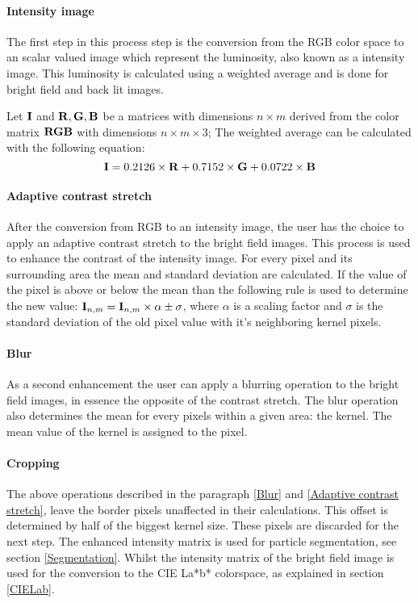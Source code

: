 \documentclass[11pt,fleqn,,a4paper,twoside,openright]{book}
\begin{document}
\paragraph{Intensity image}\label{IntensityImg} The first step in this process step is the conversion from the RGB color space to an scalar valued image which represent the luminosity, also known as a intensity image. This luminosity is calculated using a weighted average and is done for bright field and back lit images.
\begin{sBox}
	Let $\mat{I}$ and $\mat{R}, \mat{G}, \mat{B}$  be a matrices with dimensions $n \times m$ derived from the color matrix $\mat{RGB}$ with dimensions $n \times m \times 3$; The weighted average can be calculated with the following equation:
	\begin{equation}
	\mat{I} =0.2126\times \mat{R} + 0.7152\times \mat{G} + 0.0722\times \mat{B}
	\end{equation}
\end{sBox}

\paragraph{Adaptive contrast stretch}\label{Adaptive contrast stretch} After the conversion from RGB to an intensity image, the user has the choice to apply an adaptive contrast stretch to the bright field images. This process is used to enhance the contrast of the intensity image. For every pixel and its surrounding area the mean and standard deviation are calculated. If the value of the pixel is above or below the mean than the following rule is used to determine the new value: $\mat{I}_{n,m}=\mat{I}_{n,m} \times \alpha \pm \sigma$, where $\alpha$ is a scaling factor and $\sigma$ is the standard deviation of the old pixel value with it's neighboring kernel pixels.

\paragraph{Blur}\label{Blur} As a second enhancement the user can apply a blurring operation to the bright field images, in essence the opposite of the contrast stretch. The blur operation also determines the mean for every pixels within a given area: the kernel. The mean value of the kernel is assigned to the pixel.

\paragraph{Cropping}
The above operations described in the paragraph \ref{Blur} and \ref{Adaptive contrast stretch}, leave the border pixels unaffected in their calculations. This offset is determined by half of the biggest kernel size. These pixels are discarded for the next step. The enhanced intensity matrix is used for particle segmentation, see section \ref{Segmentation}. Whilst the intensity matrix of the bright field image is used for the conversion to the CIE La*b* colorspace, as explained in section \ref{CIELab}.
\end{document}

